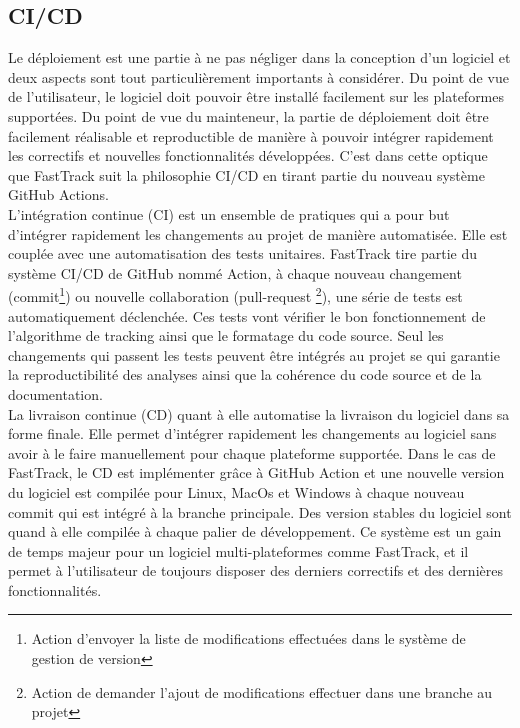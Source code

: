 		\subsection{CI/CD}
		Le déploiement est une partie à ne pas négliger dans la conception d'un logiciel et deux aspects sont tout particulièrement importants à considérer. Du point de vue de l'utilisateur, le logiciel doit pouvoir être installé facilement sur les plateformes supportées. Du point de vue du mainteneur, la partie de déploiement doit être facilement réalisable et reproductible de manière à pouvoir intégrer rapidement les correctifs et nouvelles fonctionnalités développées. C'est dans cette optique que FastTrack suit la philosophie CI/CD \cite{shahin2017continuous}\cite{wikstrom2019benefits} en tirant partie du nouveau système GitHub Actions.\\
		
		L'intégration continue (CI) est un ensemble de pratiques qui a pour but d'intégrer rapidement les changements au projet de manière automatisée. Elle est couplée avec une automatisation des tests unitaires. FastTrack tire partie du système CI/CD de GitHub nommé Action, à chaque nouveau changement (commit\footnote{Action d'envoyer la liste de modifications effectuées dans le système de gestion de version}) ou nouvelle collaboration (pull-request \footnote{Action de demander l'ajout de modifications effectuer dans une branche au projet}), une série de tests est automatiquement déclenchée. Ces tests vont vérifier le bon fonctionnement de l'algorithme de tracking ainsi que le formatage du code source. Seul les changements qui passent les tests peuvent être intégrés au projet se qui garantie la reproductibilité des analyses ainsi que la cohérence du code source et de la documentation.\\
		
		La livraison continue (CD) quant à elle automatise la livraison du logiciel dans sa forme finale. Elle permet d'intégrer rapidement les changements au logiciel sans avoir à le faire manuellement pour chaque plateforme supportée. Dans le cas de FastTrack, le CD est implémenter grâce à GitHub Action et une nouvelle version du logiciel est compilée pour Linux, MacOs et Windows à chaque nouveau commit qui est intégré à la branche principale. Des version stables du logiciel sont quand à elle compilée à chaque palier de développement. Ce système est un gain de temps majeur pour un logiciel multi-plateformes comme FastTrack, et il permet à l'utilisateur de toujours disposer des derniers correctifs et des dernières fonctionnalités.\\
		
